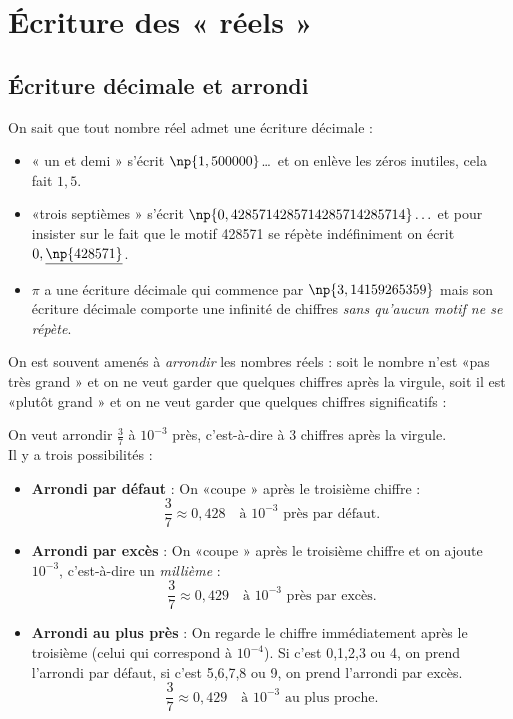 
\chapter{\'Ecriture des « réels » }

\section{\'Ecriture décimale et arrondi}
On sait que tout nombre réel admet une écriture décimale :
\begin{itemize}
	\item 	« un et demi  »  s'écrit $\np{1,500000}$\ldots\ et on enlève les zéros inutiles, cela fait $1,5$.
	\item 	«trois septièmes  »  s'écrit $\np{0,4285714285714285714285714}\ldots$ et pour insister sur le fait que le motif 428571
	      se répète indéfiniment on écrit $0,\underline{\np{428571}}$.
	\item 	$\pi$ a une écriture décimale qui commence par $\np{3,14159265359}$ mais son écriture décimale comporte une infinité de chiffres
	      \textit{sans qu'aucun motif ne se répète}.
\end{itemize}
On est souvent amenés à \textit{arrondir} les nombres réels : soit le nombre n'est «pas très grand »  et on ne veut garder que quelques chiffres
après la virgule, soit il est «plutôt grand »  et on ne veut garder que quelques chiffres significatifs :

\begin{methode}[ 1]
	On veut arrondir $\frac{3}{7}$ à $10^{-3}$ près, c'est-à-dire à 3 chiffres après la virgule.\\
	Il y a trois possibilités :
	\begin{itemize}
		\item 	\textbf{Arrondi par défaut} : On «coupe »  après le troisième chiffre :\\
		      $$\frac{3}{7}\approx 0,428\quad\textrm{à }10^{-3}\textrm{ près par défaut.}$$
		\item 	\textbf{Arrondi par excès} : On «coupe »  après le troisième chiffre et on ajoute $10^{-3}$,
		      c'est-à-dire un \textit{millième} :\\
		      $$\frac{3}{7}\approx 0,429\quad\textrm{à }10^{-3}\textrm{ près par excès.}$$
		\item 	\textbf{Arrondi au plus près} : On regarde le chiffre immédiatement après le troisième (celui qui correspond
		      à $10^{-4}$). Si c'est 0,1,2,3 ou 4, on prend l'arrondi par défaut, si c'est 5,6,7,8 ou 9, on prend l'arrondi
		      par excès.
		      $$\frac{3}{7}\approx 0,429\quad\textrm{à }10^{-3}\textrm{ au plus proche.}$$
	\end{itemize}
\end{methode}

